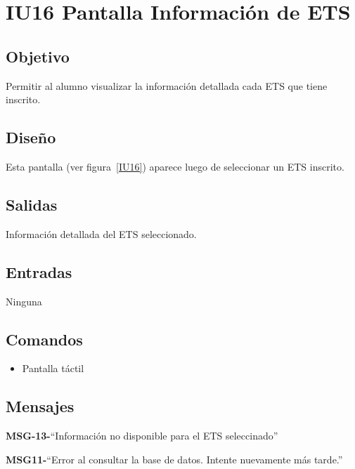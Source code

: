 \section{IU16 Pantalla Información de ETS}

\subsection{Objetivo}
Permitir al alumno visualizar la información detallada cada ETS que tiene inscrito.

\subsection{Diseño}
Esta pantalla  (ver figura~\ref{IU16}) aparece luego de seleccionar un ETS inscrito. 


\subsection{Salidas}

Información detallada del ETS seleccionado. 

\subsection{Entradas}
Ninguna


\subsection{Comandos}
\begin{itemize}
	\item Pantalla táctil
\end{itemize}

\subsection{Mensajes}

\begin{Citemize}
	\item {\bf MSG-13-}{``Información no disponible para el ETS seleccinado''}
	\item {\bf MSG11-}{``Error al consultar la base de datos. Intente nuevamente más tarde.''}
\end{Citemize}


